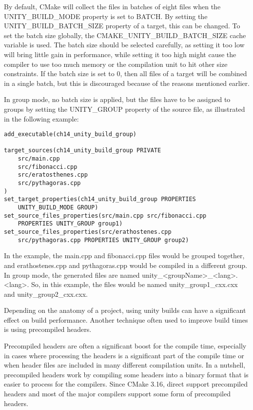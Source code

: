 By default, CMake will collect the files in batches of eight files when the UNITY\_BUILD\_MODE property is set to BATCH. By setting the UNITY\_BUILD\_BATCH\_SIZE property of a target, this can be changed. To set the batch size globally, the CMAKE\_UNITY\_BUILD\_BATCH\_SIZE cache variable is used. The batch size should be selected carefully, as setting it too low will bring little gain in performance, while setting it too high might cause the compiler to use too much memory or the compilation unit to hit other size constraints. If the batch size is set to 0, then all files of a target will be combined in a single batch, but this is discouraged because of the reasons mentioned earlier.

In group mode, no batch size is applied, but the files have to be assigned to groups by setting the UNITY\_GROUP property of the source file, as illustrated in the following example:

\begin{lstlisting}[style=styleCMake]
add_executable(ch14_unity_build_group)

target_sources(ch14_unity_build_group PRIVATE
	src/main.cpp
	src/fibonacci.cpp
	src/eratosthenes.cpp
	src/pythagoras.cpp
)
set_target_properties(ch14_unity_build_group PROPERTIES
	UNITY_BUILD_MODE GROUP)
set_source_files_properties(src/main.cpp src/fibonacci.cpp
	PROPERTIES UNITY_GROUP group1)
set_source_files_properties(src/erathostenes.cpp
	src/pythagoras.cpp PROPERTIES UNITY_GROUP group2)
\end{lstlisting}

In the example, the main.cpp and fibonacci.cpp files would be grouped together, and erathostenes.cpp and pythagoras.cpp would be compiled in a different group. In group mode, the generated files are named unity\_<groupName>\_<lang>.<lang>. So, in this example, the files would be named unity\_group1\_cxx.cxx and unity\_group2\_cxx.cxx.

Depending on the anatomy of a project, using unity builds can have a significant effect on build performance. Another technique often used to improve build times is using precompiled headers.


Precompiled headers are often a significant boost for the compile time, especially in cases where processing the headers is a significant part of the compile time or when header files are included in many different compilation units. In a nutshell, precompiled headers work by compiling some headers into a binary format that is easier to process for the compilers. Since CMake 3.16, direct support precompiled headers and most of the major compilers support some form of precompiled headers.

